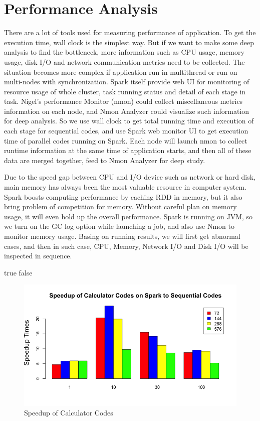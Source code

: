 \section{Performance Analysis}
There are a lot of tools used for measuring performance of application. To get the execution time, wall clock is the simplest way. But if we want to make some deep analysis to find the bottleneck, more information such as CPU usage, memory usage, disk I/O and network communication metrics need to be collected. The situation becomes more complex if application run in multithread or run on multi-nodes with synchronization. Spark itself provide web UI for monitoring of resource usage of whole cluster, task running status and detail of each stage in task. Nigel's performance Monitor (nmon) could collect miscellaneous metrics information on each node, and Nmon Analyzer could visualize such information for deep analysis. So we use wall clock to get total running time and execution of each stage for sequential codes, and use Spark web monitor UI to get execution time of parallel codes running on Spark. Each node will launch nmon to collect runtime information at the same time of application starts, and then all of these data are merged together, feed to Nmon Analyzer for deep study. 

Due to the speed gap between CPU and I/O device such as network or hard disk, main memory has always been the most valuable resource in computer system. Spark boosts computing performance by caching  RDD in memory, but it also bring problem of competition for memory. Without careful plan on memory usage, it will even hold up the overall performance. Spark is running on JVM, so we turn on the GC log option while launching a job, and also use Nmon to monitor memory usage. Basing on running results, we will first get abnormal cases, and then in such case, CPU, Memory, Network I/O and Disk I/O will be inspected in sequence.  

\ifx true false
\begin{figure}[h]
\centering
\includegraphics[scale=.60]{figures/CalcSpeedup.png}
\caption{Speedup of Calculator Codes}
\label{CalcSpeedup}
\end{figure}
\fi 


